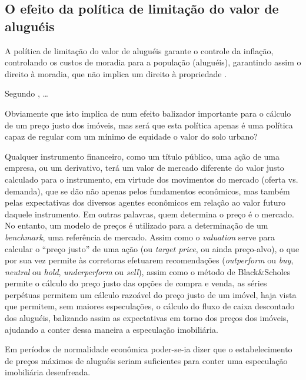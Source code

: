 \documentclass[
	12pt,				%
	oneside,			%
	a4paper,			%
	chapter=TITLE,		%
	section=TITLE,		%
	english,			%
	brazil				%
	]{abntex2}
\begin{document}
\begin{refsection}
\hypertarget{o-efeito-da-poluxedtica-de-limitauxe7uxe3o-do-valor-de-aluguuxe9is}{%
\subsection{O efeito da política de limitação do valor de aluguéis}\label{o-efeito-da-poluxedtica-de-limitauxe7uxe3o-do-valor-de-aluguuxe9is}}

A política de limitação do valor de aluguéis garante o controle da inflação,
controlando os custos de moradia para a população (aluguéis), garantindo assim
o direito à moradia, que não implica um direito à propriedade \autocite{fnogueira}.

Segundo \textcite[p.~194-195]{shelter}, \ldots{}

Obviamente que isto implica de num efeito balizador importante para o cálculo de
um preço justo dos imóveis, mas será que esta política apenas é uma política
capaz de regular com um mínimo de equidade o valor do solo urbano?

Qualquer instrumento financeiro, como um título público, uma ação de uma
empresa, ou um derivativo, terá um valor de mercado diferente do valor justo
calculado para o instrumento, em virtude dos movimentos do mercado (oferta vs.
demanda), que se dão não apenas pelos fundamentos econômicos, mas também pelas
expectativas dos diversos agentes econômicos em relação ao valor futuro daquele
instrumento. Em outras palavras, quem determina o preço é o mercado. No entanto,
um modelo de preços é utilizado para a determinação de um \emph{benchmark}, uma
referência de mercado. Assim como o \emph{valuation} serve para calcular o ``preço
justo'' de uma ação (ou \emph{target price}, ou ainda preço-alvo), o que por sua vez
permite às corretoras efetuarem recomendações (\emph{outperform} ou \emph{buy}, \emph{neutral}
ou \emph{hold}, \emph{underperform} ou \emph{sell}), assim como o método de Black\&Scholes
\autocite{marins2} permite o cálculo do preço justo das opções de compra e venda, as
séries perpétuas permitem um cálculo razoável do preço justo de um imóvel, haja
vista que permitem, sem maiores especulações, o cálculo do fluxo de caixa
descontado dos aluguéis, balizando assim as expectativas em torno dos preços dos
imóveis, ajudando a conter dessa maneira a especulação imobiliária.

Em períodos de normalidade econômica poder-se-ia dizer que o estabelecimento
de preços máximos de aluguéis seriam suficientes para conter uma especulação
imobiliária desenfreada.


\end{refsection}
\end{document}
